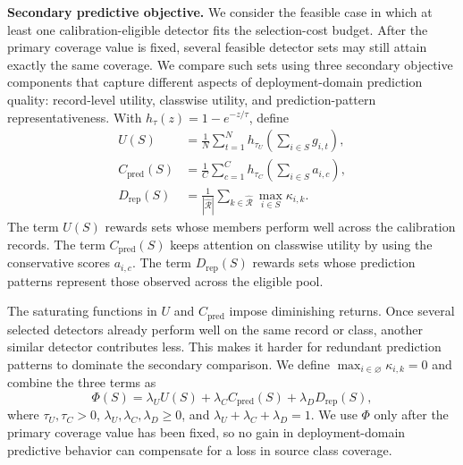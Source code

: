 \documentclass[conference]{IEEEtran}
\theoremstyle{definition}
\newcommand{\bheading}[1]{\noindent\textbf{#1.}\xspace}
\begin{document}
\bheading{Secondary predictive objective}
We consider the feasible case in which at least one calibration-eligible detector fits the selection-cost budget. 
After the primary coverage value is fixed, several feasible detector sets may still attain exactly the same coverage.
We compare such sets using three secondary objective components that capture different aspects of deployment-domain prediction quality: record-level utility, classwise utility, and prediction-pattern representativeness.
With $h_\tau(z)=1-e^{-z/\tau}$, define
\begin{align}
U(S)
&=\frac1N\sum_{t=1}^{N}
 h_{\tau_U}\!\left(\sum_{i\in S}g_{i,t}\right),
\nonumber\\
C_{\mathrm{pred}}(S)
&=\frac1C\sum_{c=1}^{C}
 h_{\tau_C}\!\left(\sum_{i\in S}a_{i,c}\right),
\nonumber\\
D_{\mathrm{rep}}(S)
&=\frac1{|\widehat{\mathcal R}|}
\sum_{k\in\widehat{\mathcal R}}
\max_{i\in S}\kappa_{i,k}.
\label{eq:secondary_components}
\end{align}
The term $U(S)$ rewards sets whose members perform well across the calibration records.
The term $C_{\mathrm{pred}}(S)$ keeps attention on classwise utility by using the conservative scores $a_{i,c}$.
The term $D_{\mathrm{rep}}(S)$ rewards sets whose prediction patterns represent those observed across the eligible pool.

The saturating functions in $U$ and $C_{\mathrm{pred}}$ impose diminishing returns.
Once several selected detectors already perform well on the same record or class, another similar detector contributes less.
This makes it harder for redundant prediction patterns to dominate the secondary comparison.
We define $\max_{i\in\varnothing}\kappa_{i,k}=0$ and combine the three terms as
\begin{equation}
\Phi(S)=\lambda_U U(S)+\lambda_C C_{\mathrm{pred}}(S)
+\lambda_D D_{\mathrm{rep}}(S),
\label{eq:secondary_objective}
\end{equation}
where $\tau_U,\tau_C>0$, $\lambda_U,\lambda_C,\lambda_D\ge0$, and $\lambda_U+\lambda_C+\lambda_D=1$.
We use $\Phi$ only after the primary coverage value has been fixed, so no gain in deployment-domain predictive behavior can compensate for a loss in source class coverage.
\end{document}
